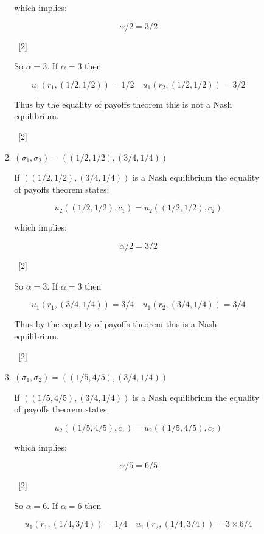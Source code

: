 \documentclass[12pt,a4paper]{article}
\begin{document}
\begin{enumerate}
\begin{enumerate}
\begin{enumerate}
\begin{enumerate}
                    which implies:

                    \[\alpha/2=3/2\]

                    ~\hfill{[2]}

                    So \(\alpha=3\). If \(\alpha=3\) then

                    \[u_1(r_1, (1/2,1/2))=1/2\quad u_1(r_2, (1/2,1/2))=3/2\]

                    Thus by the equality of payoffs theorem this is not a Nash
                    equilibrium.

                    ~\hfill{[2]}

                    \item \((\sigma_1, \sigma_2) = ((1/2,1/2), (3/4,1/4))\)

                    If \(((1/2,1/2), (3/4,1/4))\) is a Nash equilibrium the
                    equality of payoffs theorem states:

                    \[u_2((1/2,1/2),c_1)=u_2((1/2,1/2),c_2)\]

                    which implies:

                    \[\alpha/2=3/2\]

                    ~\hfill{[2]}

                    So \(\alpha=3\). If \(\alpha=3\) then

                    \[u_1(r_1, (3/4,1/4))=3/4\quad u_1(r_2, (3/4,1/4))=3/4\]

                    Thus by the equality of payoffs theorem this is a Nash
                    equilibrium.

                    ~\hfill{[2]}

                    \item \((\sigma_1, \sigma_2) = ((1/5,4/5), (3/4,1/4))\)

                    If \(((1/5,4/5), (3/4,1/4))\) is a Nash equilibrium the
                    equality of payoffs theorem states:

                    \[u_2((1/5,4/5),c_1)=u_2((1/5,4/5),c_2)\]

                    which implies:

                    \[\alpha/5=6/5\]

                    ~\hfill{[2]}

                    So \(\alpha=6\). If \(\alpha=6\) then

                    \[u_1(r_1, (1/4,3/4))=1/4\quad u_1(r_2, (1/4,3/4))=3\times6/4\]


\end{enumerate}
\end{enumerate}
\end{enumerate}
\end{enumerate}
\end{document}
